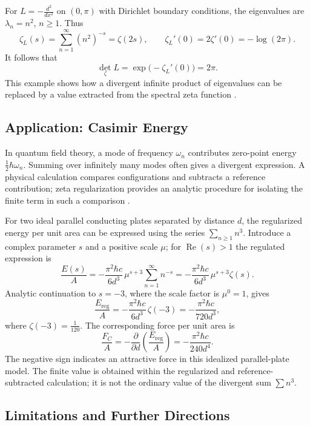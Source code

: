 \begin{example}
For $L=-\frac{d^2}{dx^2}$ on $(0,\pi)$ with Dirichlet boundary conditions, the eigenvalues are $\lambda_n=n^2$, $n\geq1$. Thus
\[
 \zeta_L(s)=\sum_{n=1}^{\infty}(n^2)^{-s}=\zeta(2s),
 \qquad
 \zeta_L'(0)=2\zeta'(0)=-\log(2\pi).
\]
It follows that
\[
 \det_{\zeta}L=\exp\!\bigl(-\zeta_L'(0)\bigr)=2\pi.
\]
This example shows how a divergent infinite product of eigenvalues can be replaced by a value extracted from the spectral zeta function \cite{SotoVillada2026ZR}.
\end{example}

\subsection{Application: Casimir Energy}

In quantum field theory, a mode of frequency $\omega_n$ contributes zero-point energy $\tfrac12\hbar\omega_n$. Summing over infinitely many modes often gives a divergent expression. A physical calculation compares configurations and subtracts a reference contribution; zeta regularization provides an analytic procedure for isolating the finite term in such a comparison \cite{SotoVillada2026ZR}.

For two ideal parallel conducting plates separated by distance $d$, the regularized energy per unit area can be expressed using the series $\sum_{n\geq1}n^3$. Introduce a complex parameter $s$ and a positive scale $\mu$; for $\operatorname{Re}(s)>1$ the regulated expression is
\[
 \frac{E(s)}{A}=-\frac{\pi^2\hbar c}{6d^3}\,\mu^{s+3}\sum_{n=1}^{\infty}n^{-s}=-\frac{\pi^2\hbar c}{6d^3}\,\mu^{s+3}\zeta(s).
\]
Analytic continuation to $s=-3$, where the scale factor is $\mu^0=1$, gives
\[
 \frac{E_{\mathrm{reg}}}{A}
 =-\frac{\pi^2\hbar c}{6d^3}\,\zeta(-3)
 =-\frac{\pi^2\hbar c}{720d^3},
\]
where $\zeta(-3)=\tfrac1{120}$. The corresponding force per unit area is
\[
 \frac{F_C}{A}=-\frac{\partial}{\partial d}\left(\frac{E_{\mathrm{reg}}}{A}\right)
 =-\frac{\pi^2\hbar c}{240d^4}.
\]
The negative sign indicates an attractive force in this idealized parallel-plate model. The finite value is obtained within the regularized and reference-subtracted calculation; it is not the ordinary value of the divergent sum $\sum n^3$.

\subsection{Limitations and Further Directions}


